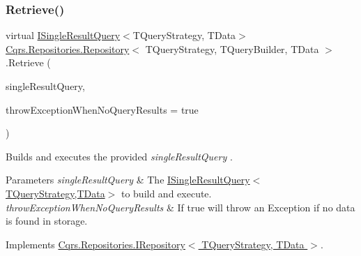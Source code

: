 \mbox{\label{classCqrs_1_1Repositories_1_1Repository_a4f83093a92d8141cdc2b908bbbd97f32_a4f83093a92d8141cdc2b908bbbd97f32}} 
\subsubsection{\texorpdfstring{Retrieve()}{Retrieve()}\hspace{0.1cm}{\footnotesize\ttfamily [1/2]}}
{\footnotesize\ttfamily virtual \hyperlink{interfaceCqrs_1_1Repositories_1_1Queries_1_1ISingleResultQuery}{I\+Single\+Result\+Query}$<$T\+Query\+Strategy, T\+Data$>$ \hyperlink{classCqrs_1_1Repositories_1_1Repository}{Cqrs.\+Repositories.\+Repository}$<$ T\+Query\+Strategy, T\+Query\+Builder, T\+Data $>$.Retrieve (\begin{DoxyParamCaption}\item[{\hyperlink{interfaceCqrs_1_1Repositories_1_1Queries_1_1ISingleResultQuery}{I\+Single\+Result\+Query}$<$ T\+Query\+Strategy, T\+Data $>$}]{single\+Result\+Query,  }\item[{bool}]{throw\+Exception\+When\+No\+Query\+Results = {\ttfamily true} }\end{DoxyParamCaption})\hspace{0.3cm}{\ttfamily [virtual]}}



Builds and executes the provided {\itshape single\+Result\+Query} . 


\begin{DoxyParams}{Parameters}
{\em single\+Result\+Query} & The \hyperlink{interfaceCqrs_1_1Repositories_1_1Queries_1_1ISingleResultQuery}{I\+Single\+Result\+Query$<$\+T\+Query\+Strategy,\+T\+Data$>$} to build and execute.\\
\hline
{\em throw\+Exception\+When\+No\+Query\+Results} & If true will throw an Exception if no data is found in storage.\\
\hline
\end{DoxyParams}


Implements \hyperlink{interfaceCqrs_1_1Repositories_1_1IRepository_a65848508067b81e82da72af2063f2c07_a65848508067b81e82da72af2063f2c07}{Cqrs.\+Repositories.\+I\+Repository$<$ T\+Query\+Strategy, T\+Data $>$}.

